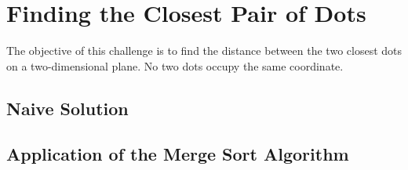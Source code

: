 \chapter{Finding the Closest Pair of Dots}
The objective of this challenge is to find the distance between the two closest
dots on a two-dimensional plane. No two dots occupy the same coordinate.

\section{Naive Solution}

\section{Application of the Merge Sort Algorithm}
